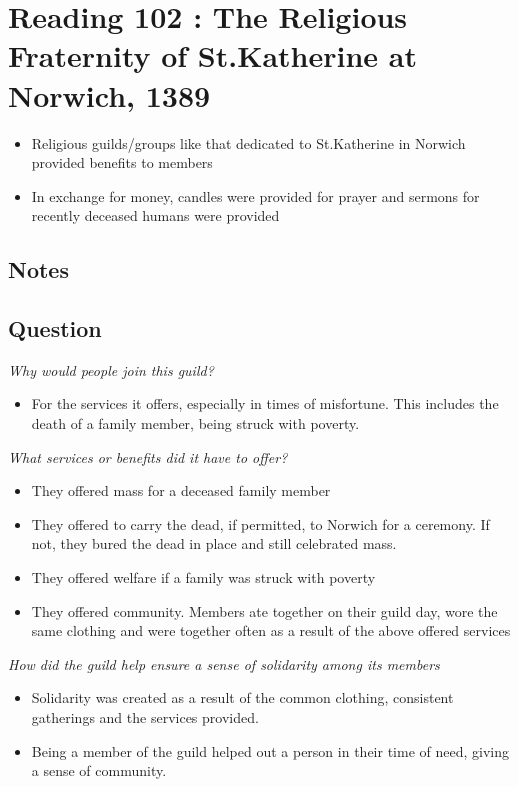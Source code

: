 \documentclass[12pt]{article}
\begin{document}
\section*{Reading 102 : The Religious Fraternity of St.Katherine at Norwich, 1389}

\begin{itemize}
	\item Religious guilds/groups like that dedicated to St.Katherine in Norwich provided benefits to members
	\item In exchange for money, candles were provided for prayer and sermons for recently deceased humans were provided
\end{itemize}

\subsection*{Notes}

\subsection*{Question}
\textit{Why would people join this guild?}
\begin{itemize}
	\item For the services it offers, especially in times of misfortune. This includes the death of a family member, being struck with poverty.
\end{itemize}

\textit{What services or benefits did it have to offer?}
\begin{itemize}
	\item They offered mass for a deceased family member
	\item They offered to carry the dead, if permitted, to Norwich for a ceremony. If not, they bured the dead in place and still celebrated mass.
	\item They offered welfare if a family was struck with poverty
	\item They offered community. Members ate together on their guild day, wore the same clothing and were together often as a result of the above offered services
\end{itemize}

\textit{How did the guild help ensure a sense of solidarity among its members}
\begin{itemize}
	\item Solidarity was created as a result of the common clothing, consistent gatherings and the services provided.
	\item Being a member of the guild helped out a person in their time of need, giving a sense of community.
\end{itemize}
\end{document}
